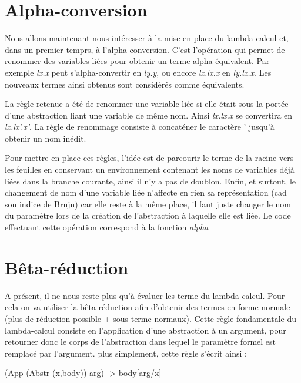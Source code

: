 \documentclass[11pt,a4paper]{report}
\begin{document}
\section{Alpha-conversion}
\bigskip
Nous allons maintenant nous intéresser à la mise en place du lambda-calcul et, dans un premier temprs, à l'alpha-conversion. C'est l'opération qui permet de renommer des variables liées pour obtenir un terme alpha-équivalent. Par exemple \textit{lx.x} peut s'alpha-convertir en \textit{ly.y}, ou encore \textit{lx.lx.x} en \textit{ly.lx.x}. Les nouveaux termes ainsi obtenus sont considérés comme équivalents.

\smallskip

La règle retenue a été de renommer une variable liée si elle était sous la portée d'une abstraction liant une variable de même nom. Ainsi \textit{lx.lx.x} se convertira en \textit{lx.lx'.x'}. La règle de renommage consiste à concaténer le caractère ' jusqu'à obtenir un nom inédit.

\smallskip

Pour mettre en place ces règles, l'idée est de parcourir le terme de la racine vers les feuilles en conservant un environnement contenant les noms de variables déjà liées dans la branche courante, ainsi il n'y a pas de doublon. Enfin, et surtout, le changement de nom d'une variable liée n'affecte en rien sa représentation (cad son indice de Brujn) car elle reste à la même place, il faut juste changer le nom du paramètre lors de la création de l'abstraction à laquelle elle est liée. Le code effectuant cette opération correspond à la fonction \textit{alpha}

\section{Bêta-réduction}

A présent, il ne nous reste plus qu'à évaluer les terme du lambda-calcul. Pour cela on va utiliser la bêta-réduction afin d'obtenir des termes en forme normale (plus de réduction possible + sous-terme normaux). Cette règle fondamentale du lambda-calcul consiste en l'application d'une abstraction à un argument, pour retourner donc le corps de l'abstraction dans lequel le paramètre formel est remplacé par l'argument. plus simplement, cette règle s'écrit ainsi :

\medskip

(App (Abstr (x,body)) arg) -> body[arg/x]

\medskip
\end{document}
